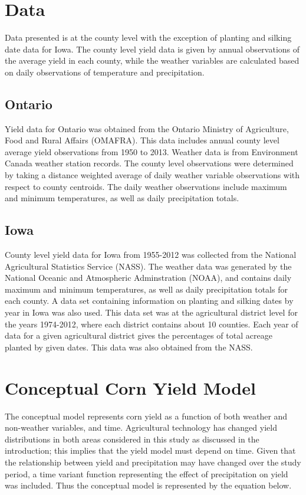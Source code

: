 \section{Data}


Data presented is at the county level with the exception of planting and silking date data for Iowa. The county level yield data is given by annual observations of the average yield in each county, while the weather variables are calculated based on daily observations of temperature and precipitation.

\subsection{Ontario}

Yield data for Ontario was obtained from the Ontario Ministry of Agriculture, Food and Rural Affairs (OMAFRA). This data includes annual county level average yield observations from 1950 to 2013. Weather data is from Environment Canada weather station records. The county level observations were determined by taking a distance weighted average of daily weather variable observations with respect to county centroids. The daily weather observations include maximum and minimum temperatures, as well as daily precipitation totals. 

\subsection{Iowa}

County level yield data for Iowa from 1955-2012 was collected from the National Agricultural Statistics Service (NASS). The weather data was generated by the National Oceanic and Atmospheric Adminstration (NOAA), and contains daily maximum and minimum temperatures, as well as daily precipitation totals for each county. A data set containing information on planting and silking dates by year in Iowa was also used. This data set was at the agricultural district level for the years 1974-2012, where each district contains about 10 counties. Each year of data for a given agricultural district gives the percentages of total acreage planted by given dates. This data was also obtained from the NASS. 



\section{Conceptual Corn Yield Model}

The conceptual model represents corn yield as a function of both weather and non-weather  variables, and time. Agricultural technology has changed yield distributions in both areas considered in this study as discussed in the introduction; this implies that the yield model must depend on time. Given that the relationship between yield and precipitation may have changed over the study period, a time variant function representing the effect of precipitation on yield was included. Thus the conceptual model is represented by the equation below.

